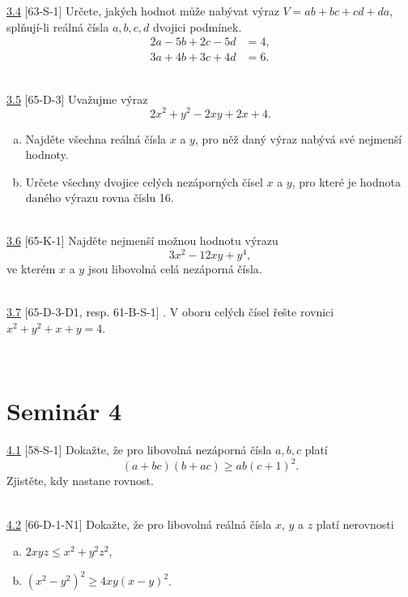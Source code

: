 \noindent \ul{3.4} [63-S-1] Určete, jakých hodnot může nabývat výraz $V = ab +
bc + cd + da$, splňují-li reálná čísla $a,b, c, d$ dvojici podmínek.
\begin{align*}
2a - 5b + 2c - 5d &= 4,\\
3a + 4b + 3c + 4d &= 6.
\end{align*}

\\

\noindent \ul{3.5} [65-D-3] Uvažujme výraz $$2x^2+ y^2 - 2xy + 2x + 4.$$
\begin{enumerate}[a)]

\item Najděte všechna reálná čísla $x$ a $y$, pro něž daný výraz nabývá své
nejmenší hodnoty.

\item Určete všechny dvojice celých nezáporných čísel $x$ a $y$, pro které je
hodnota daného výrazu rovna číslu 16.
\end{enumerate}

\\

\noindent \ul{3.6} [65-K-1] Najděte nejmenší možnou hodnotu výrazu $$3x^2 - 12xy
+ y^4,$$ ve kterém $x$ a $y$ jsou libovolná celá nezáporná čísla.


\\

\noindent \ul{3.7} [65-D-3-D1, resp. 61-B-S-1] . V oboru celých čísel řešte
rovnici $x^2+ y^2+ x + y = 4$.


\\

\section*{Seminár 4}

\noindent \ul{4.1} [58-S-1]
Dokažte, že pro libovolná nezáporná čísla $a, b, c$ platí $$(a + bc)(b + ac) \geq ab(c + 1)^2.$$
Zjistěte, kdy nastane rovnost.


\\

\noindent \ul{4.2} [66-D-1-N1] Dokažte, že pro libovolná reálná čísla $x$, $y$ a $z$ platí nerovnosti
\begin{enumerate}[a)]
\item $2xyz \leq x^2+ y^2z^2$,
\item $(x^2-y^2)^2\geq 4xy(x - y)^2$.
\end{enumerate}



